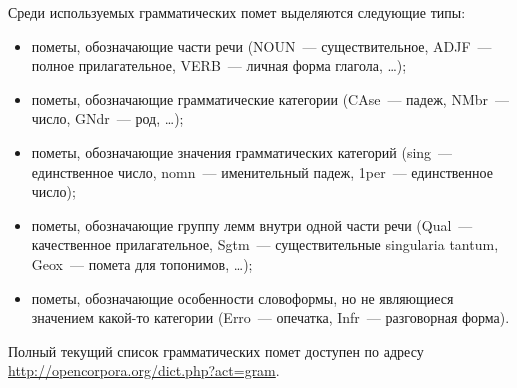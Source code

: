 \documentclass[a4paper]{article}
\begin{document}
Среди используемых грамматических помет выделяются следующие типы:
\begin{itemize}
\item пометы, обозначающие части речи (NOUN~--- существительное, ADJF~--- полное прилагательное, VERB~--- личная форма глагола, \ldots);
\item пометы, обозначающие грамматические категории (CAse~--- падеж, NMbr~--- число, GNdr~--- род, \ldots);
\item пометы, обозначающие значения грамматических категорий (sing~--- единственное число, nomn~--- именительный падеж, 1per~--- единственное число);
\item пометы, обозначающие группу лемм внутри одной части речи (Qual~--- качественное прилагательное, Sgtm~--- существительные singularia tantum, Geox~--- помета для топонимов, \ldots);
\item пометы, обозначающие особенности словоформы, но не являющиеся значением какой-то категории (Erro~--- опечатка, Infr~--- разговорная форма).
\end{itemize}

Полный текущий список грамматических помет доступен по адресу \url{http://opencorpora.org/dict.php?act=gram}.
\end{document}
